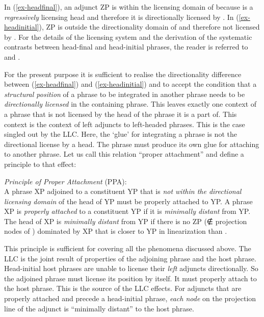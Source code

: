 \documentclass[output=paper
  ,nobabel
  ,uniformtopskip %
]{langscibook}
\begin{document}
\noindent
In (\ref{ex-headfinal}), an adjunct ZP is within the licensing domain of \xzero because \xzero is a \emph{regressively} licensing head and therefore it is directionally licensed by \xzero. In (\ref{ex-headinitial}), ZP is outside the directionality domain of \xzero and therefore not licensed by \xzero. For the details of the licensing system and the derivation of the systematic contrasts between head-final and head-initial phrases, the reader is referred to \citet{Haider2015} and \citet{Haider2020a}.

\largerpage
For the present purpose it is sufficient to realise the directionality difference between (\ref{ex-headfinal}) and (\ref{ex-headinitial}) and to accept the condition that a \emph{structural position} of a phrase to be integrated in another phrase needs to be \emph{directionally licensed} in the containing phrase. This leaves exactly one context of a phrase that is not licensed by the head of the phrase it is a part of. This context is the context of left adjuncts to left-headed phrases. This is the case singled out by the LLC. Here, the `glue' for integrating a phrase is not the directional license by a head. The phrase must produce its own glue for attaching to another phrase. Let us call this relation ``proper attachment'' and define a principle to that effect:

\ealnoraggedright\label{ex-PPA}
\ex \emph{Principle of Proper Attachment }(PPA): \\ A phrase XP adjoined to a constituent YP that is \emph{not within the directional licensing domain} of the head of YP must be properly attached to YP.
\ex A phrase XP is \emph{properly attached} to a constituent YP if it is \emph{minimally distant} from YP.
\ex The head \xzero of XP is \emph{minimally distant} from YP if there is no ZP (∉ projection nodes of \xzero) dominated by XP that is closer to YP in linearization than \xzero.
\zl

\noindent
This principle is sufficient for covering all the phenomena discussed above. The LLC is the joint result of properties of the adjoining phrase and the host phrase. Head-initial host phrases are unable to license their \emph{left} adjuncts directionally. So the adjoined phrase must license its position by itself. It must properly attach to the host phrase. This is the source of the LLC effects. For adjuncts that are properly attached and precede a head-initial phrase, \emph{each node} on the projection line of the adjunct is ``minimally distant'' to the host phrase.
\end{document}
